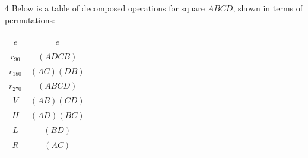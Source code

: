 \begin{example}4
    Below is a table of decomposed operations for square $ABCD$, shown in terms of permutations: 
    \begin{center}
        \begin{tabular}{c|c}
            $e$       & $e$       \\
            $r_{90}$  & $(ADCB)$  \\
            $r_{180}$ & $(AC)(DB)$ \\
            $r_{270}$ & $(ABCD)$ \\ 
            $V$       & $(AB)(CD)$       \\
            $H$       & $(AD)(BC)$       \\
            $L$       & $(BD)$       \\
            $R$       & $(AC)$       
        \end{tabular}
    \end{center}
\end{example}